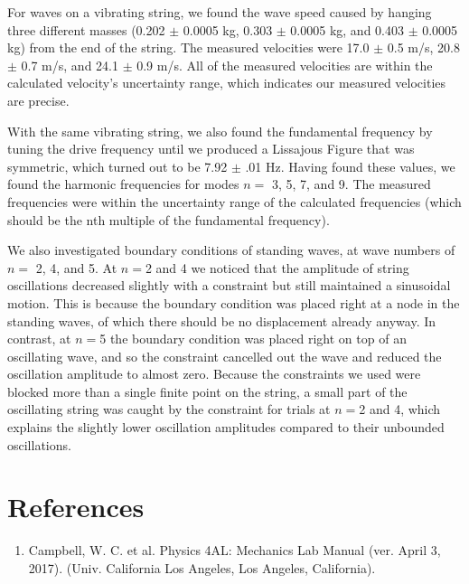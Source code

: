\documentclass[11pt]{report}
\begin{document}
For waves on a vibrating string, we found the wave speed caused by hanging three
different masses (0.202 $\pm$ 0.0005 kg, 0.303 $\pm$ 0.0005 kg, and 0.403 $\pm$
0.0005 kg) from the end of the string.  The measured velocities were 17.0 $\pm$
0.5 m/s, 20.8 $\pm$ 0.7 m/s, and 24.1 $\pm$ 0.9 m/s.  All of the measured
velocities are within the calculated velocity's uncertainty range, which
indicates our measured velocities are precise.  

With the same vibrating string, we also found the fundamental frequency by
tuning the drive frequency until we produced a Lissajous Figure that was
symmetric, which turned out to be 7.92 $\pm$ .01 Hz.  Having found these values,
we found the harmonic frequencies for modes \(n = \) 3, 5, 7, and 9.  The
measured frequencies were within the uncertainty range of the calculated
frequencies (which should be the nth multiple of the fundamental frequency).  

We also investigated boundary conditions of standing waves, at wave numbers of
\(n = \) 2, 4, and 5.  At \(n =\)2 and 4 we noticed that the amplitude of string
oscillations decreased slightly with a constraint but still maintained a
sinusoidal motion.  This is because the boundary condition was placed right at
a node in the standing waves, of which there should be no displacement already
anyway. In contrast, at \(n = \)5 the boundary condition was placed right on top
of an oscillating wave, and so the constraint cancelled out the wave and reduced
the oscillation amplitude to almost zero.  Because the constraints we used were
blocked more than a single finite point on the string, a small part of the
oscillating string was caught by the constraint for trials at \(n =\)2 and 4,
which explains the slightly lower oscillation amplitudes compared to their
unbounded oscillations.



\section*{References}
\begin{enumerate}
    \item Campbell, W. C. et al. Physics 4AL: Mechanics Lab Manual (ver. April
        3, 2017). (Univ. California Los Angeles, Los Angeles, California).
\end{enumerate}
\end{document}
